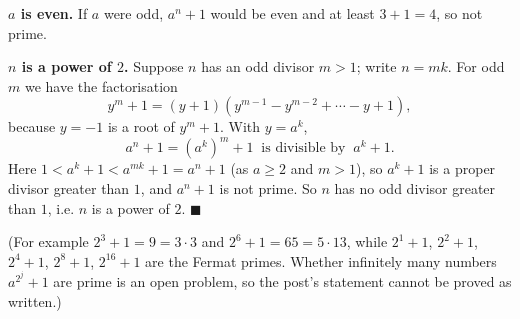 \textbf{$a$ is even.} If $a$ were odd, $a^n+1$ would be even and at least $3+1=4$, so not prime.

\textbf{$n$ is a power of $2$.} Suppose $n$ has an odd divisor $m>1$; write $n=mk$. For odd $m$ we have the factorisation
\[
y^m+1=(y+1)\left(y^{m-1}-y^{m-2}+\cdots-y+1\right),
\]
because $y=-1$ is a root of $y^m+1$. With $y=a^k$,
\[
a^n+1=(a^k)^m+1\ \text{ is divisible by }\ a^k+1 .
\]
Here $1<a^k+1<a^{mk}+1=a^n+1$ (as $a\ge2$ and $m>1$), so $a^k+1$ is a proper divisor greater than $1$, and $a^n+1$ is not prime. So $n$ has no odd divisor greater than $1$, i.e. $n$ is a power of $2$. $\blacksquare$

(For example $2^3+1=9=3\cdot3$ and $2^6+1=65=5\cdot13$, while $2^{1}+1$, $2^2+1$, $2^4+1$, $2^8+1$, $2^{16}+1$ are the Fermat primes. Whether infinitely many numbers $a^{2^j}+1$ are prime is an open problem, so the post's statement cannot be proved as written.)
